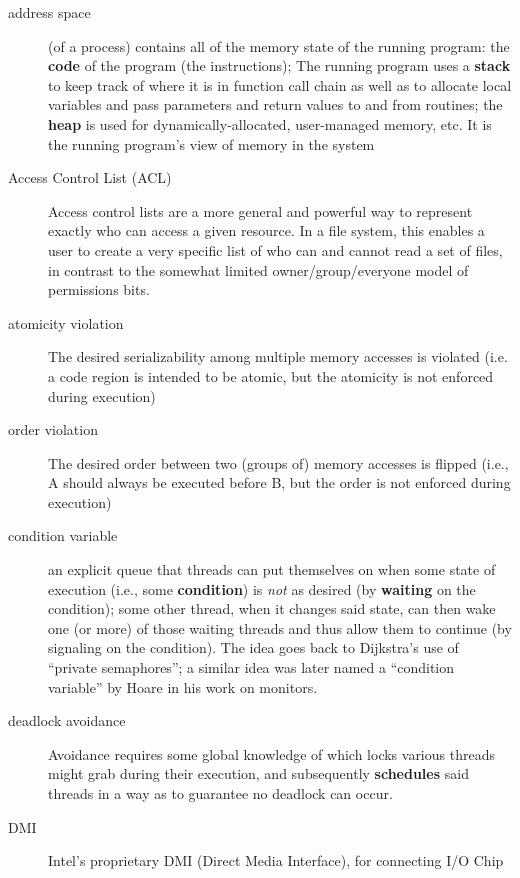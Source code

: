 \begin{description}
\item[address space] (of a process) contains all of the memory state of the
running program: the \textbf{code} of the program (the instructions); The running program uses a \textbf{stack} to keep track of where it is in function call chain as well as to allocate local variables and pass parameters and return values to and from routines; the \textbf{heap} is used for dynamically-allocated, user-managed memory, etc.  It is the running program’s view of memory in the system

\item[Access Control List (ACL)]  Access control lists are a more general and powerful way to represent exactly who can access a given resource. In a file system, this enables a user to create a very specific list of who can and cannot read a set of files, in contrast to the somewhat limited owner/group/everyone model of permissions bits.

\item[atomicity violation] The desired serializability among multiple memory accesses is violated (i.e. a code region is intended to be atomic, but the atomicity is not enforced during execution)

\item[order violation] The desired order between two (groups of) memory accesses is flipped (i.e., A should always be executed before B, but the order is not enforced during execution)

\item[condition variable] an explicit queue that threads can put themselves on when some state of execution (i.e., some \textbf{condition}) is \emph{not} as desired (by \textbf{waiting} on the condition); some other thread, when it changes said state, can then wake one (or more) of those waiting threads and thus allow them to continue (by signaling on the condition). The idea goes back to Dijkstra's use of ``private semaphores''; a similar idea was later named a ``condition variable'' by Hoare in his work on monitors.

\item[deadlock avoidance] Avoidance requires some global knowledge of which locks various threads might grab during their execution, and subsequently \textbf{schedules} said threads in a way as to guarantee no deadlock can occur.

\item[DMI]  Intel’s proprietary DMI (Direct Media Interface), for connecting I/O Chip


\end{description}
